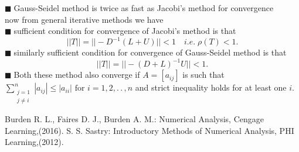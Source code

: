 \documentclass[11pt]{extarticle}
\newcommand{\ck}{.\,.\,}
\newcommand{\sm}[2]{\displaystyle\sum_{#1}^{#2}}
\newcommand{\y}{$\blacksquare\;$}
\begin{document}
\begin{multicols}{2}
{			 		\y  Gauss-Seidel method is twice as fast as Jacobi's method for convergence \\
			 		now from general iterative methods we have \\
			 		\y sufficient condition for convergence of Jacobi's method is that 
			 		\[||T||=||-D^{-1}(L+U)||<1\quad i.e.\; \rho(T)<1.\]
			 		\y similarly  sufficient condition for convergence of Gauss-Seidel method is that 
			 		\[ ||T||=||-(D+L)^{-1}U||<1.\]
			 		\y Both these method also converge if $ A =[a_{ij}]$ is such that \\
			 		 $ \sm{\substack{j=1\\ j\neq i}}{n}|a_{ij}|\leq |a_{ii}| \text{ for } i=1,2,\ck,n $ and strict inequality holds for at least one $ i $.   }
			 		 
			 		 
\begin{thebibliography}{9}
	Burden R. L., Faires D. J., Burden A. M.: Numerical Analysis, Cengage Learning,(2016).
	S. S. Sastry: Introductory Methods of Numerical Analysis, PHI Learning,(2012).
\end{thebibliography}			 		 
			 		 
	\end{multicols}
\end{document}
